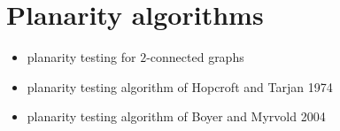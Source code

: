 
\section{Planarity algorithms}

\begin{itemize}
\item planarity testing for $2$-connected graphs

\item planarity testing algorithm of Hopcroft and Tarjan 1974

\item planarity testing algorithm of Boyer and Myrvold 2004
\end{itemize}
